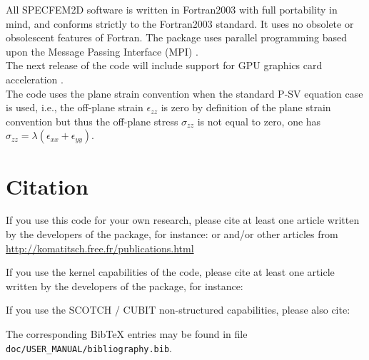 \documentclass[oneside,english,onecolumn,letterpaper]{book}
\begin{document}
All SPECFEM2D software is written in Fortran2003 with full portability
in mind, and conforms strictly to the Fortran2003 standard. It uses
no obsolete or obsolescent features of Fortran. The package uses
parallel programming based upon the Message Passing Interface (MPI)
\citep{GrLuSk94,Pac97}.\\

The next release of the code will include support for GPU graphics card acceleration \citep{KoMiEr09,KoErGoMi10,MiKo10,Kom11}.\\

The code uses the plane strain convention when the standard P-SV equation case is used, i.e.,
the off-plane strain $\epsilon_{zz}$ is zero by definition of the plane strain convention but thus the off-plane stress $\sigma_{zz}$ is not equal to zero,
one has $\sigma_{zz} = \lambda (\epsilon_{xx} + \epsilon_{yy})$.

\section{Citation}

If you use this code for your own research, please cite at least one article
written by the developers of the package, for instance:
\newline
\cite{TrKoLi08,PeKoLuMaLeCaLeMaLiBlNiBaTr11}
or
\cite{VaCaSaKoVi99, LeChKoHuTr09, LeChLiKoHuTr08, LeKoHuTr09, KoErGoMi10, KoMiEr09,
LiPoKoTr04, ChKoViCaVaFe07, KoVi98, KoTr99, KoLiTrSuStSh04, MoTr08}
and/or other articles from \url{http://komatitsch.free.fr/publications.html}
\newline

If you use the kernel capabilities of the code, please cite at least one article
written by the developers of the package, for instance:
\newline
\cite{TrKoLi08,PeKoLuMaLeCaLeMaLiBlNiBaTr11,LiTr06, MoLuTr09}
\newline

If you use the SCOTCH / CUBIT non-structured capabilities, please also cite:
\newline
\cite{MaKoBlLe08}
\newline

The corresponding Bib\TeX{} entries may be found
in file \texttt{doc/USER\_MANUAL/bibliography.bib}.
\end{document}
